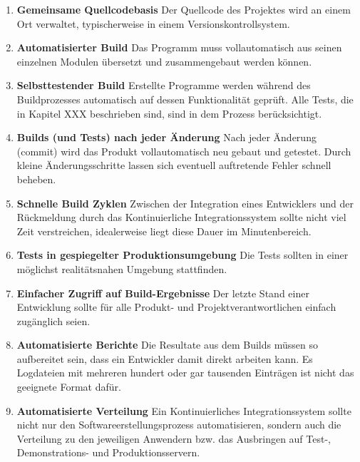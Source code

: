 \begin{enumerate}
	
	\item \textbf{Gemeinsame Quellcodebasis} \newline
	Der Quellcode des Projektes wird an einem Ort verwaltet, typischerweise in einem Versionskontrollsystem.
	
	\item \textbf{Automatisierter Build} \newline
	Das Programm muss vollautomatisch aus seinen einzelnen Modulen übersetzt und zusammengebaut werden können.
	
	\item \textbf{Selbsttestender Build} \newline
	Erstellte Programme werden während des Buildprozesses automatisch auf dessen Funktionalität geprüft. Alle Tests, die in Kapitel XXX beschrieben sind, sind in dem Prozess berücksichtigt.
	
	\item \textbf{Builds (und Tests) nach jeder Änderung} \newline
	Nach jeder Änderung (commit) wird das Produkt vollautomatisch neu gebaut und getestet. Durch kleine Änderungsschritte lassen sich eventuell auftretende Fehler schnell beheben.
	
	\item \textbf{Schnelle Build Zyklen} \newline
	Zwischen der Integration eines Entwicklers und der Rückmeldung durch das Kontinuierliche Integrationssystem sollte nicht viel Zeit verstreichen, idealerweise liegt diese Dauer im Minutenbereich.
	
	\item \textbf{Tests in gespiegelter Produktionsumgebung} \newline
	Die Tests sollten in einer möglichst realitätsnahen Umgebung stattfinden.
	
	\item \textbf{Einfacher Zugriff auf Build-Ergebnisse} \newline
	Der letzte Stand einer Entwicklung sollte für alle Produkt- und Projektverantwortlichen einfach zugänglich seien.
	
	\item \textbf{Automatisierte Berichte} \newline
	Die Resultate aus dem Builds müssen so aufbereitet sein, dass ein Entwickler damit direkt arbeiten kann. Es Logdateien mit mehreren hundert oder gar tausenden Einträgen ist nicht das geeignete Format dafür.
	
	\item \textbf{Automatisierte Verteilung} \newline
	Ein Kontinuierliches Integrationssystem sollte nicht nur den Softwareerstellungsprozess automatisieren, sondern auch die Verteilung zu den jeweiligen Anwendern bzw. das Ausbringen auf Test-, Demonstrations- und Produktionsservern. 
\end{enumerate}

